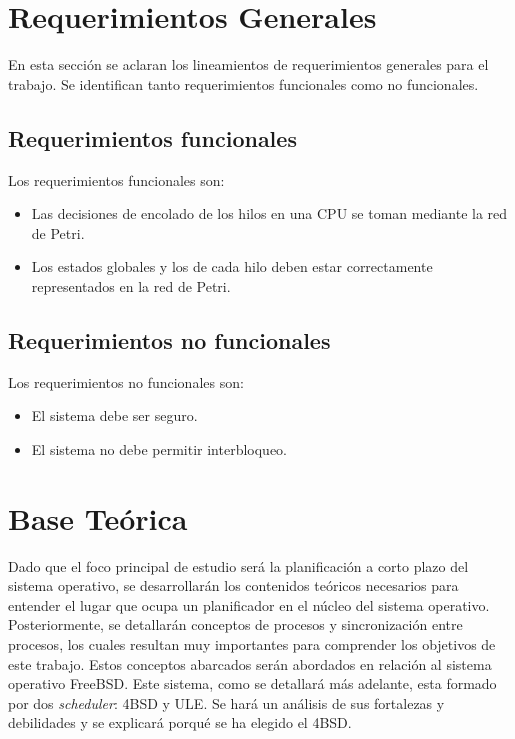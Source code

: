\documentclass[a4paper]{book}
\begin{document}
\section{Requerimientos Generales}
En esta secci\'on se aclaran los lineamientos de requerimientos generales para el trabajo. Se identifican tanto requerimientos funcionales como no funcionales.

\subsection{Requerimientos funcionales}
Los requerimientos funcionales son:
\begin{itemize}
\item Las decisiones de encolado de los hilos en una CPU se toman mediante la red de Petri.
\item Los estados globales y los de cada hilo deben estar correctamente representados en la red de Petri.
\end{itemize}

\subsection{Requerimientos no funcionales}
Los requerimientos no funcionales son:
\begin{itemize}
\item El sistema debe ser seguro.
\item El sistema no debe permitir interbloqueo.
\end{itemize}


\newpage
\section{Base Te\'orica}

Dado que el foco principal de estudio ser\'a la planificaci\'on a corto plazo del sistema operativo, se desarrollar\'an los contenidos te\'oricos necesarios para entender el lugar que ocupa un planificador en el n\'ucleo del sistema operativo. Posteriormente, se detallar\'an conceptos de procesos y sincronizaci\'on entre procesos, los cuales resultan muy importantes para comprender los objetivos de este trabajo. Estos conceptos abarcados ser\'an abordados en relaci\'on al sistema operativo FreeBSD. Este sistema, como se detallar\'a m\'as adelante, esta formado por dos \emph{scheduler}: 4BSD y ULE. Se har\'a un an\'alisis de sus fortalezas y debilidades y se explicar\'a porqu\'e se ha elegido el 4BSD.
\end{document}
